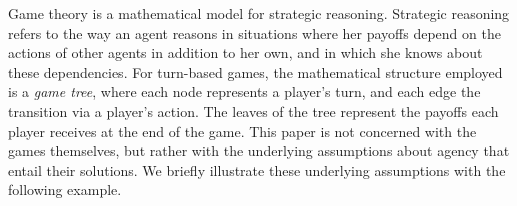 Game theory is a mathematical model for strategic reasoning. Strategic reasoning refers to the way an agent reasons in situations where her payoffs depend on the actions of other agents in addition to her own, and in which she knows about these dependencies. For turn-based games, the mathematical structure employed is a \emph{game tree}, where each node represents a player's turn, and each edge the transition via a player's action. The leaves of the tree represent the payoffs each player receives at the end of the game. This paper is not concerned with the games themselves, but rather with the underlying assumptions about agency that entail their solutions. We briefly illustrate these underlying assumptions with the following example.

